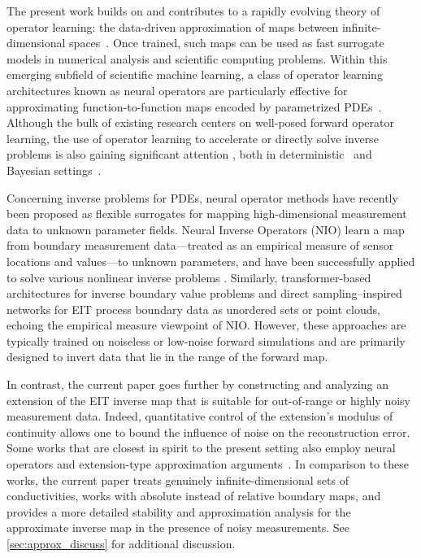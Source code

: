 \documentclass[pdflatex,sn-mathphys-num]{sn-jnl-preprint}
\theoremstyle{thmstyleone}%
\theoremstyle{thmstyletwo}%
\theoremstyle{thmstylethree}%
\numberwithin{equation}{section}
\numberwithin{theorem}{section}
\begin{document}
The present work builds on and contributes to a rapidly evolving theory of operator learning: the data-driven approximation of maps between infinite-dimensional spaces~\cite{kovachki2024operator,boulle2024mathematical,subedi2025operator,nelsen2024operator}. Once trained, such maps can be used as fast surrogate models in numerical analysis and scientific computing problems. Within this emerging subfield of scientific machine learning, a class of operator learning architectures known as neural operators are particularly effective for approximating function-to-function maps encoded by parametrized PDEs~\cite{kovachki2021neural}. Although the bulk of existing research centers on well-posed forward operator learning, the use of operator learning to accelerate or directly solve inverse problems is also gaining significant attention \cite{nelsen2025operator}, both in deterministic~\cite{kaltenbach2023semi,chen2023let,nguyen2024tnet,wang2024latent,yang2021seismic,zhang2024bilo,long2025invertible,guo2023transformer,lingsch2024fuse,jiao2024solving,massa2022approximation} and Bayesian settings~\cite{herrmann2020deep,baptista2024conditional,cao2023residual,cao2024lazydino,cao2025derivative}.

Concerning inverse problems for PDEs, neural operator methods have recently been proposed as flexible surrogates for mapping high-dimensional measurement data to unknown parameter fields. Neural Inverse Operators (NIO) learn a map from boundary measurement data---treated as an empirical measure of sensor locations and values---to unknown parameters, and have been successfully applied to solve various nonlinear inverse problems \cite{molinaro2023neural,guerra2025learning,nelsen2025operator}. Similarly, transformer-based architectures for inverse boundary value problems \cite{guo2023transformer} and direct sampling–inspired networks for EIT \cite{guo2021construct} process boundary data as unordered sets or point clouds, echoing the empirical measure viewpoint of NIO. However, these approaches are typically trained on noiseless or low-noise forward simulations and are primarily designed to invert data that lie in the range of the forward map.

In contrast, the current paper goes further by constructing and analyzing an extension of the EIT inverse map that is suitable for out-of-range or highly noisy measurement data. Indeed, quantitative control of the extension's modulus of continuity allows one to bound the influence of noise on the reconstruction error. Some works that are closest in spirit to the present setting also employ neural operators and extension-type approximation arguments~\cite{castro2024calderon,abhishek2024solving,pineda2023deep}. In comparison to these works, the current paper treats genuinely infinite-dimensional sets of conductivities, works with absolute instead of relative boundary maps, and provides a more detailed stability and approximation analysis for the approximate inverse map in the presence of noisy measurements. See \cref{sec:approx_discuss} for additional discussion.
\end{document}
